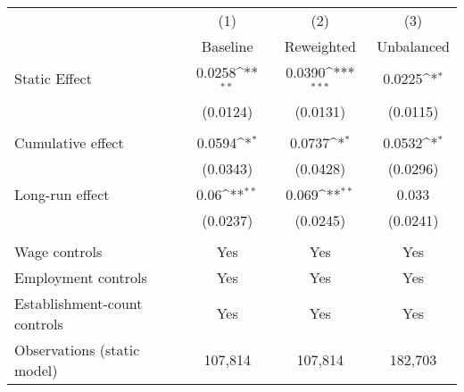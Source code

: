 {
\def\sym#1{\ifmmode^{#1}\else\(^{#1}\)\fi}
\begin{tabular}{l*{3}{c}}
\hline\hline
          &\multicolumn{1}{c}{(1)}&\multicolumn{1}{c}{(2)}&\multicolumn{1}{c}{(3)}\\
          &\multicolumn{1}{c}{Baseline}&\multicolumn{1}{c}{Reweighted}&\multicolumn{1}{c}{Unbalanced}\\
\hline
Static Effect&   0.0258\sym{**} &   0.0390\sym{***}&   0.0225\sym{*}  \\
          & (0.0124)         & (0.0131)         & (0.0115)         \\
\hline
\vspace{-2mm}&                  &                  &                  \\
Cumulative effect&0.0594\sym{*}         &0.0737\sym{*}         &0.0532\sym{*}         \\
          & (0.0343)         & (0.0428)         & (0.0296)         \\
Long-run effect&0.06\sym{**}         &0.069\sym{**}         &    0.033         \\
          & (0.0237)         & (0.0245)         & (0.0241)         \\
\hline    &                  &                  &                  \\
Wage controls&      Yes         &      Yes         &      Yes         \\
Employment controls&      Yes         &      Yes         &      Yes         \\
Establishment-count controls&      Yes         &      Yes         &      Yes         \\
Observations (static model)&  107,814         &  107,814         &  182,703         \\
\hline\hline
\end{tabular}
}
